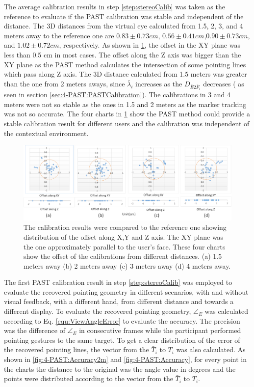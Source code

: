 The average calibration results in step \ref{step:stereoCalib} was taken as the reference to evaluate if the PAST calibration was stable and independent of the distance. The 3D distances from the virtual eye calculated from 1.5, 2, 3, and 4 meters away to the reference one are $0.83\pm0.73cm$, $0.56\pm0.41cm$,$0.90\pm0.73cm$, and $1.02\pm0.72cm$, respectively. 
As shown in \figurename{ \ref{fig:4-PAST:PAST}}, the offset in the XY plane was less than 0.5 cm in most cases. The offset along the Z axis was bigger than the XY plane as the PAST method calculates the intersection of some pointing lines which pass along Z axis. 
The 3D distance calculated from 1.5 meters was greater than the one from 2 meters aways, since $\bar\lambda_i$ increases as the $ D_{\bar E2 \bar F_i}$ decreases ( as seen in section \ref{sec:4-PAST:PASTCalibration}).  
The calibrations in 3 and 4 meters were not so stable as the ones in 1.5 and 2 meters as the marker tracking was not so accurate. The four charts in \figurename{ \ref{fig:4-PAST:PAST}} show the PAST method could provide a stable calibration result for different users and the calibration was independent of the contextual environment. 

\begin{figure}[htb]
	\centering
	\includegraphics[width=\linewidth]{figures/4-PAST/PAST.png}
	\caption{The calibration results were compared to the reference one showing distribution of the offset along X,Y and Z axis. The XY plane was the one approximately parallel to the user's face. These four charts show the offset of the calibrations from different distances. (a) 1.5 meters away (b) 2 meters away (c) 3 meters away (d) 4 meters away.}
	\label{fig:4-PAST:PAST}
\end{figure}
The first PAST calibration result in step \ref{step:stereoCalib} was employed to evaluate the recovered pointing geometry in different scenarios, with and without visual feedback, with a different hand, from different distance and towards a different display. To evaluate the recovered pointing geometry, ${\angle}_{E}$ was calculated according to Eq. \ref{equ:ViewAngleError} to evaluate the accuracy. The precision was the difference of ${\angle}_{E}$ in consecutive frames while the participant performed pointing gestures to the same target. To get a clear distribution of the error of the recovered pointing lines, the vector from the $\bar T_i$ to $T_i$ was also calculated. As shown in \figurename{ \ref{fig:4-PAST:Accuracy2m}} and \figurename{ \ref{fig:4-PAST:Accuracy}}, for every point in the charts the distance to the original was the angle value in degrees and the points were distributed according to the vector from the $\bar T_i$ to $T_i$.

